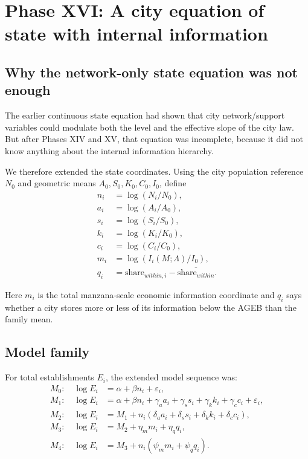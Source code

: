 \documentclass[11pt]{article}
\begin{document}
\section{Phase XVI: A city equation of state with internal information}

\subsection{Why the network-only state equation was not enough}

The earlier continuous state equation had shown that city network/support variables could modulate both the level and the effective slope of the city law. But after Phases XIV and XV, that equation was incomplete, because it did not know anything about the internal information hierarchy.

We therefore extended the state coordinates. Using the city population reference \(N_0\) and geometric means \(A_0,S_0,K_0,C_0,I_0\), define
\begin{align}
n_i &= \log(N_i/N_0),\\
a_i &= \log(A_i/A_0),\\
s_i &= \log(S_i/S_0),\\
k_i &= \log(K_i/K_0),\\
c_i &= \log(C_i/C_0),\\
m_i &= \log(I_i(M;\Lambda)/I_0),\\
q_i &= \text{share}_{within,i}-\overline{\text{share}_{within}}.
\end{align}

Here \(m_i\) is the total manzana-scale economic information coordinate and \(q_i\) says whether a city stores more or less of its information below the AGEB than the family mean.

\subsection{Model family}

For total establishments \(E_i\), the extended model sequence was:
\begin{align}
M_0: \quad
\log E_i &= \alpha + \beta n_i + \varepsilon_i,\\
M_1: \quad
\log E_i &= \alpha + \beta n_i + \gamma_a a_i + \gamma_s s_i + \gamma_k k_i + \gamma_c c_i + \varepsilon_i,\\
M_2: \quad
\log E_i &= M_1 + n_i(\delta_a a_i + \delta_s s_i + \delta_k k_i + \delta_c c_i),\\
M_3: \quad
\log E_i &= M_2 + \eta_m m_i + \eta_q q_i,\\
M_4: \quad
\log E_i &= M_3 + n_i(\psi_m m_i + \psi_q q_i).
\end{align}
\end{document}
